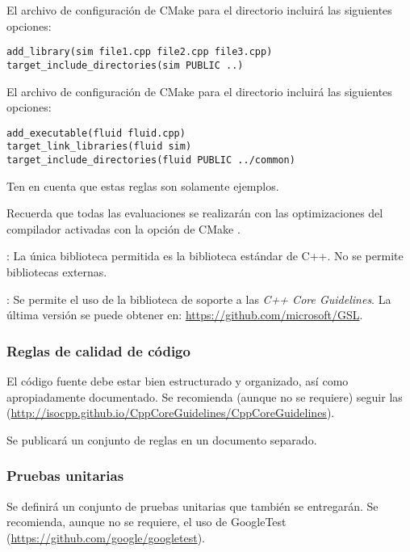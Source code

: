 El archivo de configuración de CMake para el directorio  incluirá las
siguientes opciones:

\begin{lstlisting}[title={Library sim CmakeLists.txt},frame=single]
add_library(sim file1.cpp file2.cpp file3.cpp)
target_include_directories(sim PUBLIC ..)
\end{lstlisting}

El archivo de configuración de CMake para el directorio  incluirá las
siguientes opciones:

\begin{lstlisting}[title={Program fluid CmakeLists.txt},frame=single]
add_executable(fluid fluid.cpp)
target_link_libraries(fluid sim)
target_include_directories(fluid PUBLIC ../common)
\end{lstlisting}

Ten en cuenta que estas reglas son solamente ejemplos.

Recuerda que todas las evaluaciones se realizarán con las optimizaciones del
compilador activadas con la opción de CMake
.

: 
La única biblioteca permitida es la biblioteca estándar de C++.
No se permite bibliotecas externas.

: 
Se permite el uso de la biblioteca de soporte a las \emph{C++ Core Guidelines}.
La última versión se puede obtener en:
\url{https://github.com/microsoft/GSL}.

\subsubsection{Reglas de calidad de código}

El código fuente debe estar bien estructurado y organizado, así como
apropiadamente documentado.
Se recomienda (aunque no se requiere) seguir las 
(\url{http://isocpp.github.io/CppCoreGuidelines/CppCoreGuidelines}).

Se publicará un conjunto de reglas en un documento separado.

\subsubsection{Pruebas unitarias}

Se definirá un conjunto de pruebas unitarias que también se entregarán.
Se recomienda, aunque no se requiere, el uso de GoogleTest
(\url{https://github.com/google/googletest}).

